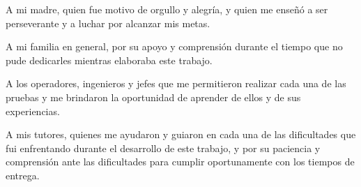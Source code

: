 \newpage
\thispagestyle{empty}
\vspace*{6cm}
\begin{flushright}
\begin{minipage}{0.55\textwidth}
\itshape

A mi madre, quien fue motivo de orgullo y alegría, y quien me enseñó a ser perseverante y a luchar por alcanzar mis metas.

\vspace{0.6cm}

A mi familia en general, por su apoyo y comprensión durante el tiempo que no pude dedicarles mientras elaboraba este trabajo.

\vspace{0.6cm}

A los operadores, ingenieros y jefes que me permitieron realizar cada una de las pruebas y me brindaron la oportunidad de aprender de ellos y de sus experiencias.

\vspace{0.6cm}

A mis tutores, quienes me ayudaron y guiaron en cada una de las dificultades que fui enfrentando durante el desarrollo de este trabajo, y por su paciencia y comprensión ante las dificultades para cumplir oportunamente con los tiempos de entrega.



\end{minipage}
\end{flushright}
